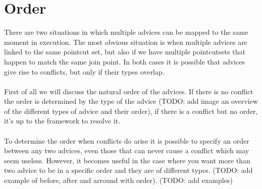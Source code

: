 \documentclass[a4paper]{report}
\begin{document}
\section{Order}
There are two situations in which multiple advices can be mapped to the same moment in execution. The most obvious situation is when multiple advices are linked to the same pointcut set, but also if we have multiple pointcutsets that happen to match the same join point. In both cases it is possible that advices give rise to conflicts, but only if their types overlap.\\
\\
First of all we will discuss the natural order of the advices. If there is no conflict the order is determined by the type of the advice (TODO: add image an overview of the different types of advice and their order), if there is a conflict but no order, it's up to the framework to resolve it.\\
\\
To determine the order when conflicts do arise it is possible to specify an order between any two advices, even those that can never cause a conflict which may seem useless. However, it becomes useful in the case where you want more than two advice to be in a specific order and they are of different types. (TODO: add example of before, after and arround with order).
(TODO: add examples)
\end{document}
